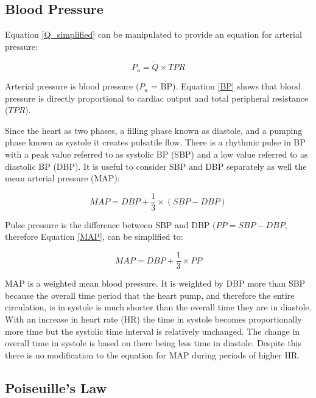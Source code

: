 \subsection{Blood Pressure}

Equation \ref{Q_simplified} can be manipulated to provide an equation for arterial pressure:

\begin{equation}
    P_{a} = \dot{Q} \times TPR
    \label{BP}
\end{equation}

Arterial pressure is blood pressure ($P_a$ = BP). Equation \ref{BP} shows that blood pressure is directly proportional to cardiac output and total peripheral resistance ($TPR$). 

Since the heart as two phases, a filling phase known as diastole, and a pumping phase known as systole it creates pulsatile flow. There is a rhythmic pulse in BP with a peak value referred to as systolic BP (SBP) and a low value referred to as diastolic BP (DBP). It is useful to consider SBP and DBP separately as well the mean arterial pressure (MAP):

\begin{equation}
    MAP = DBP + \frac{1}{3} \times (SBP - DBP)
    \label{MAP}
\end{equation}

Pulse pressure is the difference between SBP and DBP ($PP = SBP - DBP$, therefore Equation \ref{MAP}, can be simplified to:

\begin{equation}
    MAP = DBP + \frac{1}{3} \times PP
    \label{MAP_simplified}
\end{equation}

MAP is a weighted mean blood pressure. It is weighted by DBP more than SBP because the overall time period that the heart pump, and therefore the entire circulation, is in systole is much shorter than the overall time they are in diastole. With an increase in heart rate (HR) the time in systole becomes proportionally more time but the systolic time interval is relatively unchanged. The change in overall time in systole is based on there being less time in diastole. Despite this there is no modification to the equation for MAP during periods of higher HR.

\subsection{Poiseuille's Law}


